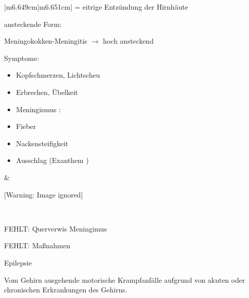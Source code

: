 \documentclass{article}
\makeatletter
\newcommand\captionof[1]{\def\@captype{#1}\caption}
\makeatother
\begin{document}
\begin{center}
\tablehead{}\begin{supertabular}{|m{6.649cm}|m{6.651cm}|}
\hline
= eitrige Entz\"undung der Hirnh\"aute

ansteckende Form:

Meningokokken-Meningitis ${\rightarrow}$ hoch ansteckend

Symptome:

\begin{itemize}
\item Kopfschmerzen, Lichtscheu

\item Erbrechen, \"Ubelkeit

\item Meningismus :

\end{itemize}
\begin{itemize}
\item Fieber

\item Nackensteifigkeit

\end{itemize}
\begin{itemize}
\item Ausschlag (Exanthem )

\end{itemize}
 &
\begin{center}
 [Warning: Image ignored] %

\end{center}
\captionof{figure}[Endstadium einer bakteriellen Meningitis. Die Flecken
auf der Haut sind Blutungen in Folge einer nicht mehr funktionierenden
Blutgerinnung. Der Tod ist bei diesem Patienten innerhalb weniger
Stunden zu erwarten.]{Endstadium einer bakteriellen Meningitis. Die
Flecken auf der Haut sind Blutungen in Folge einer nicht mehr
funktionierenden Blutgerinnung. Der Tod ist bei diesem Patienten
innerhalb weniger Stunden zu erwarten.}
\\\hline
\end{supertabular}
\end{center}
FEHLT: Querverwis Meningimus

FEHLT: Ma{\ss}nahmen

Epilepsie%
%


Vom Gehirn ausgehende motorische Krampfanf\"alle aufgrund von akuten
oder  chronischen Erkrankungen des Gehirns.
\end{document}
